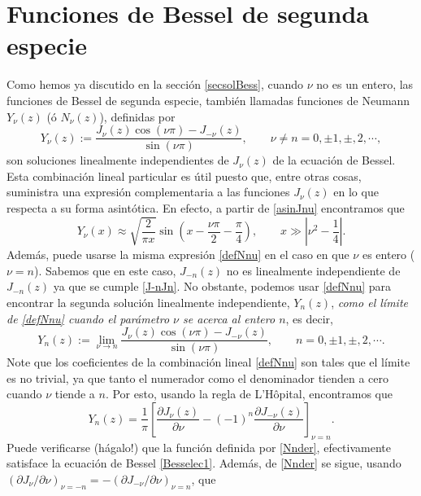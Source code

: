 \section{Funciones de Bessel de segunda especie}\label{sec:FB2E}
Como hemos ya discutido en la sección \ref{secsolBess}, cuando $\nu$ no es un entero, las funciones de Bessel de segunda especie, también llamadas funciones de Neumann $Y_\nu(z)$ (ó $N_\nu(z)$), definidas por
\begin{equation}\label{defNnu}
Y_\nu (z):=  \frac{J_\nu(z) \cos(\nu \pi) - J_{-\nu}(z)}{\sin(\nu \pi)} , \qquad \nu\neq n=0, \pm 1, \pm, 2, \cdots,
\end{equation}
son soluciones linealmente independientes de $J_\nu(z)$ de la ecuación de Bessel. Esta combinación lineal particular es útil puesto que, entre otras cosas, suministra una expresión complementaria a las funciones $J_\nu(z)$ en lo que respecta a su forma asintótica. En efecto, a partir de \eqref{asinJnu} encontramos que
\begin{equation}\label{asinNnu}
\boxed{Y_\nu(x)\approx \sqrt{\frac{2}{\pi x}}\sin\left(x-\frac{\nu\pi}{2}-\frac{\pi}{4}\right), 
\qquad x\gg\left|\nu^2-\frac{1}{4}\right|.}
\end{equation}
Además, puede usarse la misma expresión \eqref{defNnu} en el caso en que $\nu$ es entero ($\nu=n$). Sabemos que en este caso, $J_{-n}(z)$ no es linealmente independiente de $J_{-n}(z)$ ya que se cumple \eqref{J-nJn}. No obstante, podemos usar \eqref{defNnu} para encontrar la segunda solución linealmente independiente, $Y_n(z)$, \textit{como el límite de \eqref{defNnu} cuando el parámetro $\nu$ se acerca al entero $n$}, es decir,
\begin{equation}\label{Nnlim}
Y_n(z):=  \lim_{\nu\to n}\frac{J_\nu(z) \cos(\nu \pi) - J_{-\nu}(z)}{\sin(\nu \pi)} , \qquad n=0, \pm 1, \pm, 2, \cdots .
\end{equation}
Note que los coeficientes de la combinación lineal \eqref{defNnu} son tales que el límite es no trivial, ya que tanto el numerador como el denominador tienden a cero cuando $\nu$ tiende a $n$. Por esto, usando la regla de L'H\^opital, encontramos que
\begin{equation}\label{Nnder}
Y_n(z)=\frac{1}{\pi}\left[\frac{\partial J_\nu(z)}{\partial\nu}-(-1)^n\frac{\partial J_{-\nu}(z)}{\partial\nu}\right]_{\nu=n}.
\end{equation}
Puede verificarse (hágalo!) que la función definida por \eqref{Nnder}, efectivamente satisface la ecuación de Bessel \eqref{Besselec1}. Además, de \eqref{Nnder} se sigue, usando $(\partial J_\nu/\partial\nu)_{\nu=-n}=-(\partial J_{-\nu}/\partial\nu)_{\nu=n}$, que
